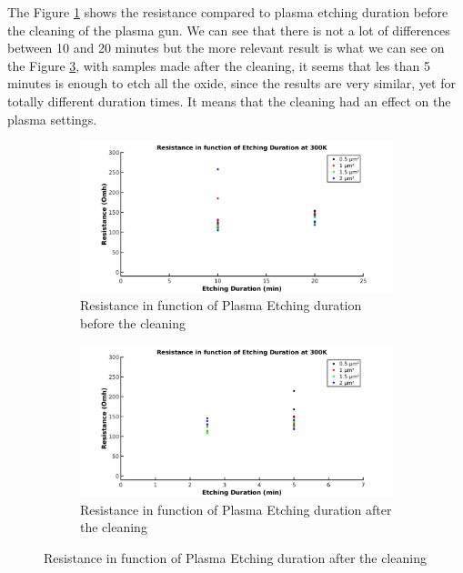                  
                The Figure \ref{PlasmaTimeBefore} shows the resistance compared to plasma etching duration before the cleaning of the plasma gun. We can see that there is not a lot of differences between 10 and 20 minutes but the more relevant result is what we can see on the Figure \ref{PlasmaTimeAfter}, with samples made after the cleaning, it seems that les than 5 minutes is enough to etch all the oxide, since the results are very similar, yet for totally different duration times. It means that the cleaning had an effect on the plasma settings.
                \begin{figure}
                    \centering
                    \begin{subfigure}{0.5\textwidth}
                    \includegraphics{R_TimeBefore.png}
                    \caption{Resistance in function of Plasma Etching duration before the cleaning}
                    \label{PlasmaTimeBefore}
                    \end{subfigure}
                    \begin{subfigure}{O.5\textwidth}
                    \includegraphics{R_TimeAfter.png}
                    \caption{Resistance in function of Plasma Etching duration after the cleaning}
                    \label{PlasmaTimeAfter}
                    \end{subfigure}
                \end{figure}
                
